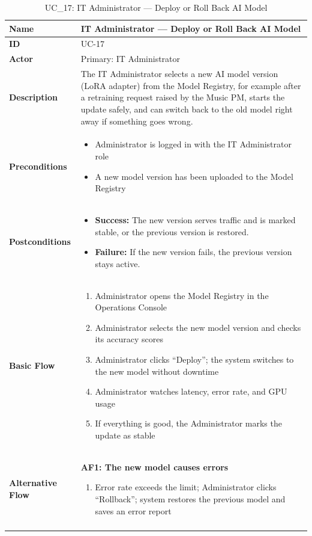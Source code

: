 \documentclass[a4paper]{article}
\newlength{\ucLeft}
\begin{document}
\begin{longtable}{|>{\bfseries}p{\ucLeft}|p{\dimexpr\linewidth-\ucLeft-2\tabcolsep-2\arrayrulewidth}|}
\hline
Name & IT Administrator --- Deploy or Roll Back AI Model \\ \hline
ID & UC-17 \\ \hline
Actor & Primary: IT Administrator \\ \hline
Description & The IT Administrator selects a new AI model version (LoRA adapter) from the Model Registry, for example after a retraining request raised by the Music PM, starts the update safely, and can switch back to the old model right away if something goes wrong. \\ \hline
Preconditions &
\begin{itemize}[leftmargin=1em, nosep, topsep=2pt, partopsep=0pt, parsep=0pt, after=\strut]
    \item Administrator is logged in with the IT Administrator role
    \item A new model version has been uploaded to the Model Registry
\end{itemize}
\\ \hline
Postconditions &
\begin{itemize}[leftmargin=1em, nosep, topsep=2pt, partopsep=0pt, parsep=0pt, after=\strut]
    \item \textbf{Success:} The new version serves traffic and is marked stable, or the previous version is restored.
    \item \textbf{Failure:} If the new version fails, the previous version stays active.
\end{itemize}
\\ \hline
Basic Flow &
\begin{enumerate}[leftmargin=1.5em, nosep, topsep=2pt, partopsep=0pt, parsep=0pt, after=\strut]
    \item Administrator opens the Model Registry in the Operations Console
    \item Administrator selects the new model version and checks its accuracy scores
    \item Administrator clicks ``Deploy''; the system switches to the new model without downtime
    \item Administrator watches latency, error rate, and GPU usage
    \item If everything is good, the Administrator marks the update as stable
\end{enumerate}
\\ \hline
Alternative Flow &
\textbf{AF1: The new model causes errors}
\begin{enumerate}[leftmargin=1.5em, nosep, topsep=2pt, partopsep=0pt, parsep=0pt, after=\strut]
    \item Error rate exceeds the limit; Administrator clicks ``Rollback''; system restores the previous model and saves an error report
\end{enumerate}
\\ \hline
\caption{UC\_17: IT Administrator --- Deploy or Roll Back AI Model}\label{tab:uc17_model}
\end{longtable}
\end{document}
